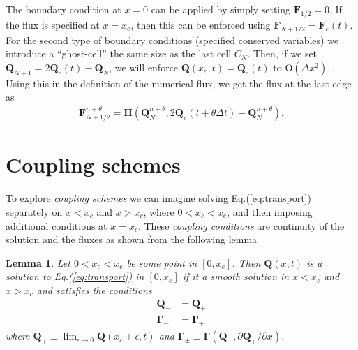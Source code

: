 \documentclass[reqno]{amsart}
\newcommand{\eqr}[1]{Eq.\thinspace(#1)}
\newcommand{\pfracb}[2]{\partial #1/\partial #2}
\newcommand{\mvec}[1]{\mathbf{#1}}
\newcommand{\gvec}[1]{\boldsymbol{#1}}
\newtheorem{lem}{Lemma}
\theoremstyle{definition}
\begin{document}
The boundary condition at $x=0$ can be applied by simply setting
$\mvec{F}_{1/2}=0$. If the flux is specified at $x=x_e$, then this can
be enforced using $\mvec{F}_{N+1/2}=\mvec{F}_e(t)$. For the second
type of boundary conditions (specified conserved variables) we
introduce a ``ghost-cell'' the same size as the last cell $C_N$. Then,
if we set $\mvec{Q}_{N+1} = 2\mvec{Q}_e(t) - \mvec{Q}_N$, we will
enforce $\mvec{Q}(x_e,t) = \mvec{Q}_e(t)$ to $\textrm{O}(\Delta
x^2)$. Using this in the definition of the numerical flux, we get the
flux at the last edge as
\begin{align}
  \mvec{F}_{N+1/2}^{n+\theta} = \mvec{H}(\mvec{Q}_N^{n+\theta},
  2\mvec{Q}_e(t+\theta\Delta t) - \mvec{Q}_N^{n+\theta}).
\end{align}

\section{Coupling schemes}

To explore \emph{coupling schemes} we can imagine solving
\eqr{\ref{eq:transport}} separately on $x<x_c$ and $x>x_c$, where
$0<x_c<x_e$, and then imposing additional conditions at $x=x_c$. These
\emph{coupling conditions} are continuity of the solution and the
fluxes as shown from the following lemma
\begin{lem}
  \label{lem:couple-conditions}
  Let $0<x_c<x_e$ be some point in $[0,x_e]$. Then $\mvec{Q}(x,t)$ is
  a solution to \eqr{\ref{eq:transport}} in $[0,x_e]$ if it a smooth
  solution in $x<x_c$ and $x>x_c$ and satisfies the conditions
  \begin{align}
    \mvec{Q}_- &= \mvec{Q}_+ \\
    \mvec{\Gamma}_- &= \mvec{\Gamma}_+
  \end{align}
  where $\mvec{Q}_\pm \equiv \lim_{\epsilon\rightarrow
    0}\mvec{Q}(x_c\pm\epsilon,t)$ and $\gvec{\Gamma}_\pm \equiv
  \gvec{\Gamma}(\mvec{Q}_\pm,\pfracb{\mvec{Q}_\pm}{x})$.
\end{lem}
\end{document}
